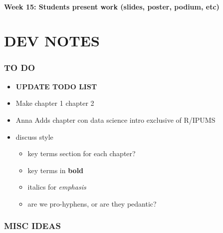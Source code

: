 \documentclass[
]{book}
\providecommand{\tightlist}{%
  \setlength{\itemsep}{0pt}\setlength{\parskip}{0pt}}
\begin{document}
\hypertarget{week-15-students-present-work-slides-poster-podium-etc}{%
\subsubsection*{Week 15: Students present work (slides, poster, podium, etc)}\label{week-15-students-present-work-slides-poster-podium-etc}}

\hypertarget{dev-notes}{%
\chapter*{DEV NOTES}\label{dev-notes}}

\hypertarget{to-do}{%
\subsection*{TO DO}\label{to-do}}

\begin{itemize}
\item
  \textbf{UPDATE TODO LIST}
\item
  Make chapter 1 chapter 2
\item
  Anna Adds chapter con data science intro exclusive of R/IPUMS
\item
  discuss style

  \begin{itemize}
  \tightlist
  \item
    key terms section for each chapter?
  \item
    key terms in \textbf{bold}
  \item
    italics for \emph{emphasis}
  \item
    are we pro-hyphens, or are they pedantic?
  \end{itemize}
\end{itemize}

\hypertarget{misc-ideas}{%
\subsection*{MISC IDEAS}\label{misc-ideas}}
\end{document}
